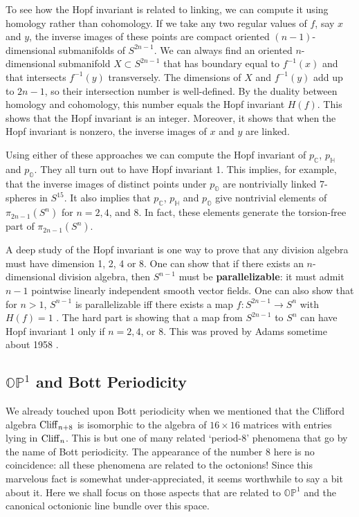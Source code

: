 \documentclass[12pt]{article}
\newcommand\C{{\mathbb C}}
\renewcommand\H{{\mathbb H}}
\renewcommand\O{{\mathbb O}}
\newcommand\OP{{\mathbb {OP}}}
\newcommand{\Cliff}{{\rm Cliff}}
\newcommand{\maps}{\colon}
\begin{document}
To see how the Hopf invariant is related to linking, we can compute it 
using homology rather than cohomology.  If we take any two regular 
values of $f$, say $x$ and $y$, the inverse images of these points are 
compact oriented $(n-1)$-dimensional submanifolds of $S^{2n-1}$.   We 
can always find an oriented $n$-dimensional submanifold $X \subset 
S^{2n-1}$ that has boundary equal to $f^{-1}(x)$ and that intersects 
$f^{-1}(y)$ transversely.  The dimensions of $X$ and $f^{-1}(y)$ add up 
to $2n-1$, so their intersection number is well-defined.  By the  
duality between homology and cohomology, this number equals the Hopf 
invariant $H(f)$.   This shows that the Hopf invariant is an integer.  
Moreover, it shows that when the Hopf invariant is nonzero, the inverse 
images of $x$ and $y$ are linked. 

Using either of these approaches we can compute the Hopf invariant of 
$p_\C$, $p_\H$ and $p_\O$.  They all turn out to have Hopf invariant 1.  
This implies, for example, that the inverse images of distinct points 
under $p_\O$ are nontrivially linked 7-spheres in $S^{15}$.  It 
also implies that $p_\C$, $p_\H$ and $p_\O$ give nontrivial elements of 
$\pi_{2n-1}(S^n)$ for $n = 2, 4$, and $8$.  In fact, these elements
generate the torsion-free part of $\pi_{2n-1}(S^n)$.

A deep study of the Hopf invariant is one way to prove that any division
algebra must have dimension 1, 2, 4 or 8.  One can show that if there
exists an $n$-dimensional division algebra, then $S^{n-1}$ must be {\bf
parallelizable}: it must admit $n - 1$ pointwise linearly independent
smooth vector fields.  One can also show that for $n > 1$, $S^{n-1}$ is
parallelizable iff there exists a map $f \maps S^{2n-1} \to S^n$ with
$H(f) = 1$ \cite{AH,BM,Kervaire}.  The hard part is showing that a map from
$S^{2n-1}$ to $S^n$ can have Hopf invariant 1 only if $n = 2, 4$, or
$8$.  This was proved by Adams sometime about 1958 \cite{Adams0}.

\subsection{$\OP^1$ and Bott Periodicity} \label{bott}  
 
We already touched upon Bott periodicity when we mentioned that the 
Clifford algebra $\Cliff_{n+8}$ is isomorphic to the algebra of $16  
\times 16$ matrices with entries lying in $\Cliff_n$.  This is but one 
of many related `period-8' phenomena that go by the name of Bott  
periodicity.  The appearance of the number 8 here is no coincidence: all 
these phenomena are related to the octonions!  Since this marvelous   
fact is somewhat under-appreciated, it seems worthwhile to say a bit   
about it.   Here we shall focus on those aspects that are related to   
$\OP^1$ and the canonical octonionic line bundle over this space.    
  
\end{document}

